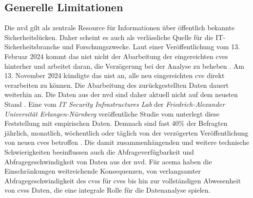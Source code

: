 \subsection{Generelle Limitationen}
\label{limitation-generell}
\par Die \gls{nvd} gilt als zentrale Resource für Informationen über öffentlich bekannte Sicherheitslücken. Daher scheint es auch als verlässliche Quelle für die IT-Sicherheitsbranche und Forschungszwecke. Laut einer Veröffentlichung vom 13. Februar 2024 kommt das \gls{nist} nicht der Abarbeitung der eingereichten \glspl{cve} hinterher und arbeitet daran, die Verzögerung bei der Analyse zu beheben \autocite{NVDProgramAnnouncement}. Am 13. November 2024 kündigte das \gls{nist} an, alle neu eingereichten \gls{cve} direkt verarbeiten zu können. Die Abarbeitung des zurückgestellten Daten dauert weiterhin an. Die Daten aus der \gls{nvd} sind daher aktuell  nicht auf dem neusten Stand \autocite{NationalVulnerabilityDatabase2024}. Eine vom \textit{IT Security Infrastructures Lab} der \textit{Friedrich-Alexander Universität Erlangen-Nürnberg} veröffentliche Studie vom  unterlegt diese Feststellung mit empirischen Daten. Demnach sind fast 40\% der Befragten jährlich, monatlich, wöchentlich oder täglich von der verzögerten Veröffentlichung von neuen \glspl{cve} betroffen \autocite{wunderNVDUsersAttitudes2024}. Die damit zusammenhängenden und weitere technische Schwierigkeiten beeinflussen auch die Abfrageverfügbarkeit und Abfragegeschwindigkeit von Daten aus der \gls{nvd}. Für \gls{acema} haben die Einschränkungen weitreichende Konsequenzen, von verlangsamter Abfragegeschwindigkeit des \gls{cvss} für \glspl{cve} bis hin zur vollständigen Abwesenheit von \gls{cvss} Daten, die eine integrale Rolle für die Datenanalyse spielen.
%

